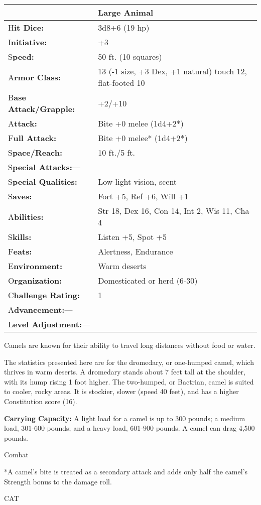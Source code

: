 \documentclass{article}
\begin{document}
\begin{tabular}{|>{\raggedright}p{91pt}|>{\raggedright}p{223pt}|}
\hline
  & Large Animal\tabularnewline
\hline
H\textbf{it Dice:} & 3d8+6 (19 hp)\tabularnewline
\hline
I\textbf{nitiative:} & +3\tabularnewline
\hline
S\textbf{peed:} & 50 ft. (10 squares)\tabularnewline
\hline
A\textbf{rmor Class:} & 13 (-1 size, +3 Dex, +1 natural) touch 12, flat-footed 
10\tabularnewline
\hline
B\textbf{ase Attack/Grapple:} & +2/+10\tabularnewline
\hline
A\textbf{ttack:} & Bite +0 melee (1d4+2*)\tabularnewline
\hline
F\textbf{ull Attack:} & Bite +0 melee* (1d4+2*)\tabularnewline
\hline
S\textbf{pace/Reach:} & 10 ft./5 ft.\tabularnewline
\hline
S\textbf{pecial Attacks:}--- & \tabularnewline
\hline
S\textbf{pecial Qualities:} & Low-light vision, scent\tabularnewline
\hline
S\textbf{aves:} & Fort +5, Ref +6, Will +1\tabularnewline
\hline
A\textbf{bilities:} & Str 18, Dex 16, Con 14, Int 2, Wis 11, Cha 4\tabularnewline
\hline
S\textbf{kills:} & Listen +5, Spot +5\tabularnewline
\hline
F\textbf{eats:} & Alertness, Endurance\tabularnewline
\hline
E\textbf{nvironment:} & Warm deserts\tabularnewline
\hline
O\textbf{rganization:} & Domesticated or herd (6-30)\tabularnewline
\hline
C\textbf{hallenge Rating:} & 1\tabularnewline
\hline
A\textbf{dvancement:}--- & \tabularnewline
\hline
L\textbf{evel Adjustment:}--- & \tabularnewline
\hline
\end{tabular}

Camels are known for their ability to travel long distances without food or water.

The statistics presented here are for the dromedary, or one-humped camel, which 
thrives in warm deserts. A dromedary stands about 7 feet tall at the shoulder, 
with its hump rising 1 foot higher. The two-humped, or Bactrian, camel is suited 
to cooler, rocky areas. It is stockier, slower (speed 40 feet), and has a higher 
Constitution score (16).

\textbf{Carrying Capacity:} A light load for a camel is up to 300 pounds; a medium 
load, 301-600 pounds; and a heavy load, 601-900 pounds. A camel can drag 4,500 
pounds.

Combat

*A camel's bite is treated as a secondary attack and adds only half the camel's 
Strength bonus to the damage roll.

\vspace{12pt}
CAT
\end{document}
